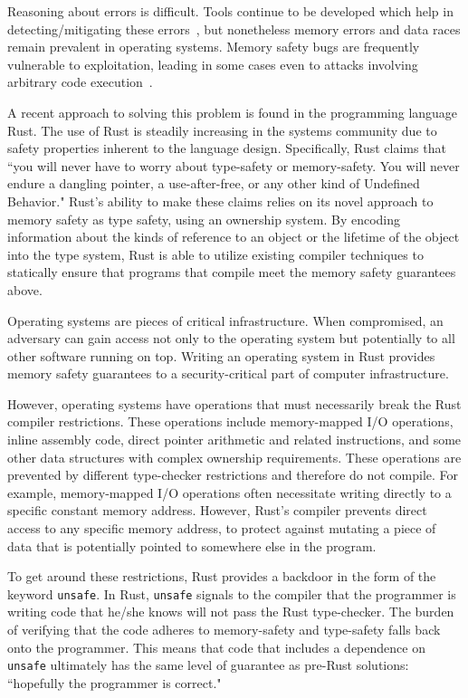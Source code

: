 \documentclass[12pt]{article}
\begin{document}
Reasoning about errors is difficult. Tools continue to be developed which help in detecting/mitigating these errors~\cite{criswell2009memory, kuvaiskii2017sgxbounds, seyster2011redflag}, but nonetheless memory errors and data races remain prevalent in operating systems. Memory safety bugs are frequently vulnerable to exploitation, leading in some cases even to attacks involving arbitrary code execution~\cite{android_vulnerabilities, shacham2007geometry}.

A recent approach to solving this problem is found in the programming language Rust. The use of Rust is steadily increasing in the systems community due to safety properties inherent to the language design. Specifically, Rust claims that
``you will never have to worry about type-safety or memory-safety. You will never endure a dangling pointer, a use-after-free, or any other kind of Undefined Behavior."\cite{rust_nomicon}
Rust's ability to make these claims relies on its novel approach to memory safety as type safety, using an ownership system. By encoding information about the kinds of reference to an object or the lifetime of the object into the type system, Rust is able to utilize existing compiler techniques to statically ensure that programs that compile meet the memory safety guarantees above.

Operating systems are pieces of critical infrastructure. When compromised, an adversary can gain access not only to the operating system but potentially to all other software running on top. Writing an operating system in Rust provides memory safety guarantees to a security-critical part of computer infrastructure.

However, operating systems have operations that must necessarily break the Rust compiler restrictions. These operations include memory-mapped I/O operations, inline assembly code, direct pointer arithmetic and related instructions, and some other data structures with complex ownership requirements. These operations are prevented by different type-checker restrictions and therefore do not compile. For example, memory-mapped I/O operations often necessitate writing directly to a specific constant memory address. However, Rust's compiler prevents direct access to any specific memory address, to protect against mutating a piece of data that is potentially pointed to somewhere else in the program.

To get around these restrictions, Rust provides a backdoor in the form of the keyword \texttt{unsafe}. In Rust, \texttt{unsafe} signals to the compiler that the programmer is writing code that he/she knows will not pass the Rust type-checker. The burden of verifying that the code adheres to memory-safety and type-safety falls back onto the programmer. This means that code that includes a dependence on \texttt{unsafe} ultimately has the same level of guarantee as pre-Rust solutions: ``hopefully the programmer is correct."
\end{document}
